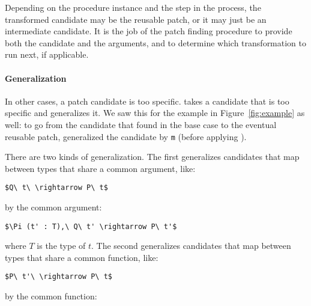 Depending on the procedure instance and the step in the process, the transformed candidate may be the reusable patch,
or it may just be an intermediate candidate.
It is the job of the patch finding procedure to provide both the candidate and the arguments,
and to determine which transformation to run next, if applicable.

\iffalse
It works by combining application with reduction, with just one derivation:

\begin{mathpar}
\small
\hfill\fbox{$\Gamma$ $\vdash$ $(t,\ \vec{a},\ \Downarrow{r}) \Downarrow_{s} t'$ }\\

\inferrule[Specialize]
  { \Gamma \vdash t\ \vec{a} \Downarrow_{r} t'}
  { \Gamma \vdash (t,\ \vec{a},\ \Downarrow_{r}) \Downarrow_{s} t'}
\end{mathpar}
There is just one super weird thing I do not even know if I am allowed to do here:
the reduction strategy $\Downarrow_{r}$ is itself a transformation that reduces a term in an arbitrary way.
\fi

\paragraph{Generalization} In other cases, a patch candidate is too specific.
 takes a candidate that is too specific and generalizes it.
We saw this for the example in Figure~\ref{fig:example} as well:
to go from the candidate that \sysname found in the base case to the eventual reusable patch,
\sysname generalized the candidate by \lstinline{m} (before applying ).

There are two kinds of generalization.
The first generalizes candidates that map between types that share a common argument, like: %

\begin{lstlisting}[language=coq]
  $Q\ t\ \rightarrow P\ t$
\end{lstlisting}
by the common argument:

\begin{lstlisting}[language=coq]
  $\Pi (t' : T),\ Q\ t' \rightarrow P\ t'$
\end{lstlisting}
where $T$ is the type of $t$.
The second generalizes candidates that map between types that share a common function, like:

\begin{lstlisting}[language=coq]
  $P\ t'\ \rightarrow P\ t$
\end{lstlisting}
by the common function:


